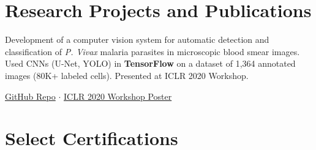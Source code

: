 \documentclass[letterpaper]{twentysecondcv} %
\begin{document}
\section{Research Projects and Publications}

Development of a computer vision system for automatic detection and classification of \textit{P. Vivax} malaria parasites in microscopic blood smear images. Used CNNs (U-Net, YOLO) in \textbf{TensorFlow} on a dataset of 1,364 annotated images (80K+ labeled cells). Presented at ICLR 2020 Workshop.

\href{https://github.com/ErickDiaz/bioinformatic_thesis_project/tree/dev}{GitHub Repo} $\cdot$ \href{https://pml4dc.github.io/iclr2020/program/pml4dc_45.html}{ICLR 2020 Workshop Poster}

\section{Select Certifications}

\begin{twenty}
\end{twenty}
\end{document}
